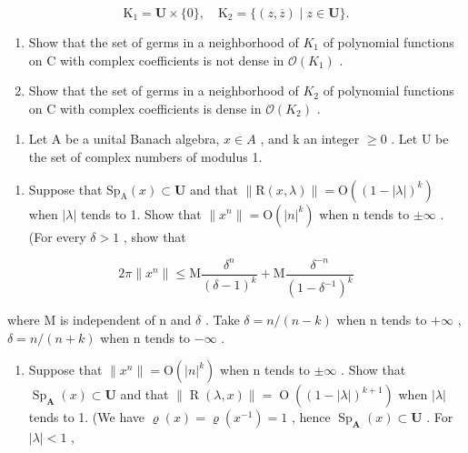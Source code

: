 \[
\mathrm{K} _ {1} = \mathbf {U} \times \{0 \}, \quad \mathrm{K} _ {2} = \{(z, \overline {{z}}) \mid z \in \mathbf {U} \}.
\]

\begin{enumerate}
\def\labelenumi{\alph{enumi})}
\item
  Show that the set of germs in a neighborhood of \(K_{1}\) of polynomial functions on C with complex coefficients is not dense in \(\mathcal{O}(K_{1})\) .
\item
  Show that the set of germs in a neighborhood of \(K_{2}\) of polynomial functions on C with complex coefficients is dense in \(\mathcal{O}(K_{2})\) .
\end{enumerate}

\begin{enumerate}
\def\labelenumi{\arabic{enumi})}
\setcounter{enumi}{15}
\tightlist
\item
  Let A be a unital Banach algebra, \(x \in A\) , and k an integer \(\geqslant 0\) . Let U be the set of complex numbers of modulus 1.
\end{enumerate}

\begin{enumerate}
\def\labelenumi{\alph{enumi})}
\tightlist
\item
  Suppose that \(\mathrm{Sp}_{\mathrm{A}}(x)\subset\mathbf{U}\) and that \(\|\mathrm{R}(x,\lambda)\|=\mathrm{O}((1-|\lambda|)^{k})\) when \(|\lambda|\) tends to 1. Show that \(\|x^{n}\|=\mathrm{O}(|n|^{k})\) when n tends to \(\pm\infty\) . (For every \(\delta>1\) , show that
\end{enumerate}

\[
2 \pi \| x ^ {n} \| \leqslant \mathrm{M} \frac {\delta^ {n}}{(\delta - 1) ^ {k}} + \mathrm{M} \frac {\delta^ {- n}}{(1 - \delta^ {- 1}) ^ {k}}
\]

where M is independent of n and \(\delta\) . Take \(\delta = n/(n - k)\) when n tends to \(+\infty\) , \(\delta = n/(n + k)\) when n tends to \(-\infty\) .

\begin{enumerate}
\def\labelenumi{\alph{enumi})}
\setcounter{enumi}{1}
\tightlist
\item
  Suppose that \(\|x^{n}\|=\mathrm{O}(|n|^{k})\) when n tends to \(\pm\infty\) . Show that \(\operatorname{Sp}_{\mathbf{A}}(x)\subset\mathbf{U}\) and that \(\|\operatorname{R}(\lambda,x)\|=\operatorname{O}((1-|\lambda|)^{k+1})\) when \(|\lambda|\) tends to 1. (We have \(\varrho(x)=\varrho(x^{-1})=1\) , hence \(\operatorname{Sp}_{\mathbf{A}}(x)\subset\mathbf{U}\) . For \(|\lambda|<1\) ,
\end{enumerate}

